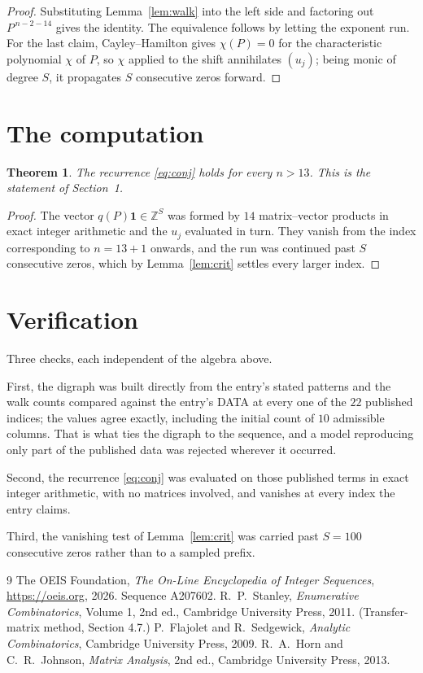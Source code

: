 \documentclass[11pt,a4paper]{article}
\theoremstyle{plain}
\newtheorem{theorem}{Theorem}
\theoremstyle{definition}
\begin{document}
\begin{proof}
Substituting Lemma~\ref{lem:walk} into the left side and factoring out
$P^{\,n-2-14}$ gives the identity. The equivalence follows by letting the exponent
run. For the last claim, Cayley--Hamilton gives $\chi(P)=0$ for the characteristic
polynomial $\chi$ of $P$, so $\chi$ applied to the shift annihilates $(u_j)$; being monic of
degree $S$, it propagates $S$ consecutive zeros forward.
\end{proof}

\section{The computation}

\begin{theorem}
The recurrence \eqref{eq:conj} holds for every $n>13$. This is the statement of
Section~1.
\end{theorem}

\begin{proof}
The vector $q(P)\mathbf{1}\in\mathbb{Z}^{S}$ was formed by $14$ matrix--vector
products in exact integer arithmetic and the $u_j$ evaluated in turn. They vanish from the
index corresponding to $n=13+1$ onwards, and the run was continued past $S$ consecutive
zeros, which by Lemma~\ref{lem:crit} settles every larger index.
\end{proof}

\section{Verification}

Three checks, each independent of the algebra above.

First, the digraph was built directly from the entry's stated patterns and the walk counts
compared against the entry's DATA at every one of the $22$ published indices; the
values agree exactly, including the initial count of $10$ admissible columns. That is
what ties the digraph to the sequence, and a model reproducing only part of the published
data was rejected wherever it occurred.

Second, the recurrence \eqref{eq:conj} was evaluated on those published terms in exact
integer arithmetic, with no matrices involved, and vanishes at every index the entry claims.

Third, the vanishing test of Lemma~\ref{lem:crit} was carried past $S=100$ consecutive
zeros rather than to a sampled prefix.

\begin{thebibliography}{9}
 The OEIS Foundation, \emph{The On-Line Encyclopedia of Integer
Sequences}, \url{https://oeis.org}, 2026. Sequence A207602.
 R.~P.~Stanley, \emph{Enumerative Combinatorics}, Volume 1, 2nd ed.,
Cambridge University Press, 2011. (Transfer-matrix method, Section 4.7.)
 P.~Flajolet and R.~Sedgewick, \emph{Analytic Combinatorics}, Cambridge
University Press, 2009.
 R.~A.~Horn and C.~R.~Johnson, \emph{Matrix Analysis}, 2nd ed., Cambridge
University Press, 2013.
\end{thebibliography}
\end{document}

